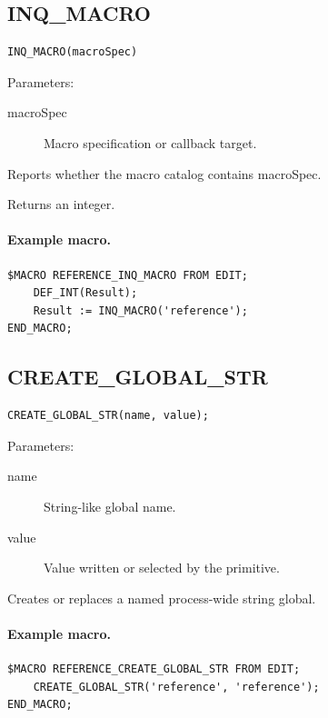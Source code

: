 \documentclass[a4paper,10pt,twoside,openany]{book}
\newenvironment{mrmacextension}{\begin{changebar}}{\end{changebar}}
\begin{document}
\label{prim:intrinsic-inq-macro}
\subsection*{INQ\_MACRO}
\begin{verbatim}
INQ_MACRO(macroSpec)
\end{verbatim}
Parameters:
\begin{description}
\item[macroSpec] Macro specification or callback target.
\end{description}

Reports whether the macro catalog contains macroSpec.

Returns an integer.

\paragraph{Example macro.}
\begin{verbatim}
$MACRO REFERENCE_INQ_MACRO FROM EDIT;
    DEF_INT(Result);
    Result := INQ_MACRO('reference');
END_MACRO;
\end{verbatim}


\begin{mrmacextension}
\label{prim:procedure-create-global-str}
\subsection*{CREATE\_GLOBAL\_STR}
\begin{verbatim}
CREATE_GLOBAL_STR(name, value);
\end{verbatim}
Parameters:
\begin{description}
\item[name] String-like global name.
\item[value] Value written or selected by the primitive.
\end{description}

Creates or replaces a named process-wide string global.

\paragraph{Example macro.}
\begin{verbatim}
$MACRO REFERENCE_CREATE_GLOBAL_STR FROM EDIT;
    CREATE_GLOBAL_STR('reference', 'reference');
END_MACRO;
\end{verbatim}
\end{mrmacextension}
\end{document}
